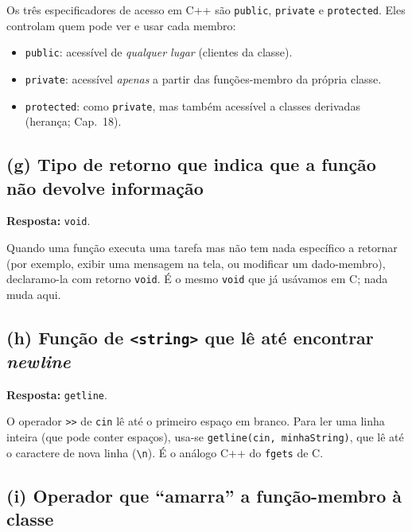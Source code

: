 \documentclass[11pt,a4paper]{article}
\begin{document}
Os tr\^es especificadores de acesso em C++ s\~ao \texttt{public}, \texttt{private} e \texttt{protected}. Eles controlam quem pode ver e usar cada membro:
\begin{itemize}[leftmargin=*,itemsep=0pt]
  \item \texttt{public}: acess\'ivel de \emph{qualquer lugar} (clientes da classe).
  \item \texttt{private}: acess\'ivel \emph{apenas} a partir das fun\c{c}\~oes-membro da pr\'opria classe.
  \item \texttt{protected}: como \texttt{private}, mas tamb\'em acess\'ivel a classes derivadas (heran\c{c}a; Cap.~18).
\end{itemize}

\subsection*{(g) Tipo de retorno que indica que a fun\c{c}\~ao n\~ao devolve informa\c{c}\~ao}

\begin{resposta}\textbf{Resposta:} \texttt{void}.\end{resposta}

Quando uma fun\c{c}\~ao executa uma tarefa mas n\~ao tem nada espec\'ifico a retornar (por exemplo, exibir uma mensagem na tela, ou modificar um dado-membro), declaramo-la com retorno \texttt{void}. \'E o mesmo \texttt{void} que j\'a us\'avamos em C; nada muda aqui.

\subsection*{(h) Fun\c{c}\~ao de \texttt{<string>} que l\^e at\'e encontrar \emph{newline}}

\begin{resposta}\textbf{Resposta:} \texttt{getline}.\end{resposta}

O operador \texttt{>>} de \texttt{cin} l\^e at\'e o primeiro espa\c{c}o em branco. Para ler uma linha inteira (que pode conter espa\c{c}os), usa-se \texttt{getline(cin, minhaString)}, que l\^e at\'e o caractere de nova linha (\texttt{\textbackslash n}). \'E o an\'alogo C++ do \texttt{fgets} de C.

\subsection*{(i) Operador que ``amarra'' a fun\c{c}\~ao-membro \`a classe}
\end{document}
